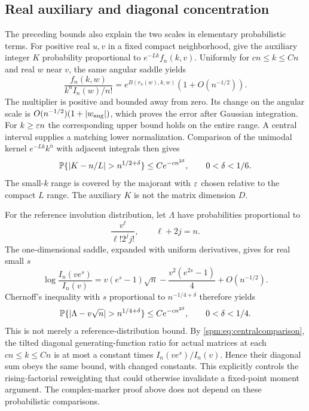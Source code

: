 \subsection{Real auxiliary and diagonal concentration}
The preceding bounds also explain the two scales in elementary probabilistic terms. For positive real $u,v$ in a fixed compact neighborhood, give the auxiliary integer $K$ probability proportional to $e^{-Lk}f_n(k,v)$. Uniformly for $cn\leq k\leq Cn$ and real $w$ near $v$, the same angular saddle yields
\begin{equation}\label{spm:eq:centralcomparison}
 \frac{f_n(k,w)}{k^n I_n(w)/n!}
 =e^{B(r_n(w),k,w)}(1+O(n^{-1/2})).
\end{equation}
The multiplier is positive and bounded away from zero. Its change on the angular scale is $O(n^{-1/2})(1+|w_{\rm ang}|)$, which proves the error after Gaussian integration. For $k\geq\varepsilon n$ the corresponding upper bound holds on the entire range. A central interval supplies a matching lower normalization. Comparison of the unimodal kernel $e^{-Lk}k^n$ with adjacent integrals then gives
\begin{equation}\label{spm:eq:Ktail}
 \PP\{|K-n/L|>n^{1/2+\delta}\}
 \leq C e^{-c n^{2\delta}},\qquad 0<\delta<1/6.
\end{equation}
The small-$k$ range is covered by the majorant with $\varepsilon$ chosen relative to the compact $L$ range. The auxiliary $K$ is not the matrix dimension $D$.

For the reference involution distribution, let $\Lambda$ have probabilities proportional to
\[
 \frac{v^\ell}{\ell!2^j j!},\qquad \ell+2j=n.
\]
The one-dimensional saddle, expanded with uniform derivatives, gives for real small $s$
\begin{equation}\label{spm:eq:reference-mgf}
 \log\frac{I_n(ve^s)}{I_n(v)}
 =v(e^s-1)\sqrt n-\frac{v^2(e^{2s}-1)}4+O(n^{-1/2}).
\end{equation}
Chernoff's inequality with $s$ proportional to $n^{-1/4+\delta}$ therefore yields
\begin{equation}\label{spm:eq:fixedpointtail}
 \PP\{|\Lambda-v\sqrt n|>n^{1/4+\delta}\}
 \leq C e^{-c n^{2\delta}},\qquad 0<\delta<1/4.
\end{equation}
This is not merely a reference-distribution bound. By \eqref{spm:eq:centralcomparison}, the tilted diagonal generating-function ratio for actual matrices at each $cn\leq k\leq Cn$ is at most a constant times $I_n(ve^s)/I_n(v)$. Hence their diagonal sum obeys the same bound, with changed constants. This explicitly controls the rising-factorial reweighting that could otherwise invalidate a fixed-point moment argument. The complex-marker proof above does not depend on these probabilistic comparisons.

